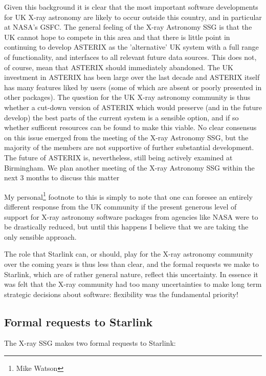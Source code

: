 Given this background it is clear that the most important software
developments for UK X-ray astronomy are likely to occur outside this
country, and in particular at NASA's GSFC. The general feeling of the
X-ray Astronomy SSG is that the UK cannot hope to compete in this area
and that there is little point in continuing to develop ASTERIX as the
'alternative' UK system with a full range of functionality, and
interfaces to all relevant future data sources. This does not, of
course, mean that ASTERIX should immediately abandoned. The UK
investment in ASTERIX has been large over the last decade and ASTERIX
itself has many features liked by users (some of which are absent or
poorly presented in other packages). The question for the UK X-ray
astronomy community is thus whether a cut-down version of ASTERIX
which would preserve (and in the future develop) the best parts of the
current system is a sensible option, and if so whether sufficent
resources can be found to make this viable. No clear consensus on this
issue emerged from the meeting of the X-ray Astronomy SSG, but the
majority of the members are not supportive of further substantial
development. The future of ASTERIX is, nevertheless, still being
actively examined at Birmingham. We plan another meeting of the X-ray
Astronomy SSG within the next 3 months to discuss this matter

My personal\footnote{Mike Watson} footnote to this is simply to note
that one can foresee an entirely different response from the UK
community if the present generous level of support for X-ray astronomy
software packages from agencies like NASA were to be drastically
reduced, but until this happens I believe that we are taking the only
sensible approach.

The role that Starlink can, or should, play for the X-ray astronomy
community over the coming years is thus less than clear, and the
formal requests we make to Starlink, which are of rather general
nature, reflect this uncertainty. In essence it was felt that the
X-ray community had too many uncertainties to make long term strategic
decisions about software: flexibility was the fundamental priority!

\subsection{Formal requests to Starlink}

The X-ray SSG makes two formal requests to Starlink:

